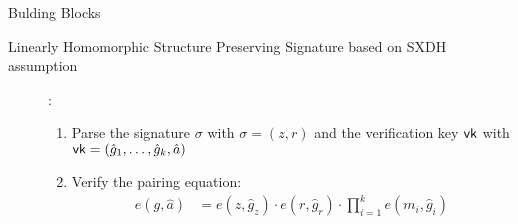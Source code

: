 \begin{subsection}{Bulding Blocks}
\begin{myDef}{Linearly Homomorphic Structure Preserving Signature based on SXDH assumption}
\begin{description}
    \item[]:
      \begin{enumerate}
      \item Parse the signature $\sigma$ with $\sigma = (z, r)$ and the verification key $\mathsf{vk}$ with $\mathsf{vk} = (\hat{g}_1, \dots, \hat{g}_k, \hat{a})$
      \item Verify the pairing equation:
        \begin{align*}
          e(g, \hat{a}) &= e(z, \hat{g}_z) \cdot e(r, \hat{g}_r) \cdot \prod_{i = 1}^ke(m_i, \hat{g}_i)
        \end{align*}
      \end{enumerate}
    \end{description}
  \end{myDef}
\end{subsection}
